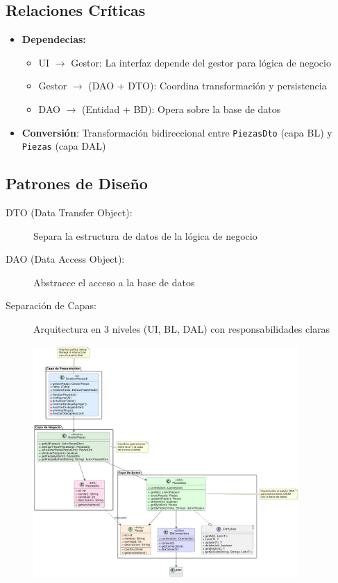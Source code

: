 \subsection*{Relaciones Críticas}
\begin{itemize}[leftmargin=*]
    \item \textbf{Dependecias: }
    \begin{itemize}
        \item UI $\rightarrow$ Gestor: La interfaz depende del gestor para lógica de negocio
        \item Gestor $\rightarrow$ (DAO + DTO): Coordina transformación y persistencia
        \item DAO $\rightarrow$ (Entidad + BD): Opera sobre la base de datos
    \end{itemize}
    
    \item \textbf{Conversión}: Transformación bidireccional entre \texttt{PiezasDto} (capa BL) y \texttt{Piezas} (capa DAL)
\end{itemize}

\subsection*{Patrones de Diseño}
\begin{description}
    \item[DTO (Data Transfer Object):] Separa la estructura de datos de la lógica de negocio
    \item[DAO (Data Access Object):] Abstracce el acceso a la base de datos
    \item[Separación de Capas:] Arquitectura en 3 niveles (UI, BL, DAL) con responsabilidades claras
\end{description}

\begin{figure}[h]
\centering
\includegraphics[width=0.9\textwidth]{imag/DiagramaFinalUML.png}

\end{figure}


